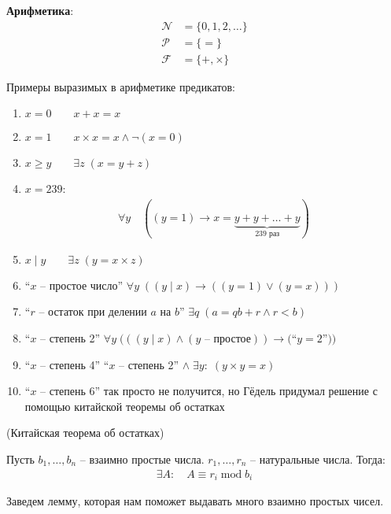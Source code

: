 \begin{conj}
    \textbf{Арифметика}:
    \begin{align*}
        \mathcal{N} &= \{0, 1, 2, \dots\} \\
        \mathcal{P} &= \{=\} \\
        \mathcal{F} &= \{+, \times \}
    \end{align*}
\end{conj}
Примеры выразимых в арифметике предикатов:
\begin{enumerate}
    \item $x = 0 \qquad x+x=x$
    \item $x=1 \qquad x \times x = x \land \lnot (x=0)$
    \item $x \geqslant y \qquad \exists z \; (x = y + z)$
    \item $x = 239$:
    \begin{gather*}
        \forall y \quad ((y=1) \longrightarrow x = \underbrace{y + y + \dots + y}_{239 \text{ раз}})
    \end{gather*}
    \item $x \mid y \qquad \exists z \; (y = x \times z)$
    \item ``$x$ -- простое число'' \qquad $\forall y \; ((y \mid x) \longrightarrow ((y=1) \lor (y=x)))$
    \item ``$r$ -- остаток при делении $a$ на $b$'' \qquad $\exists q \; (a = qb + r \land r < b)$
    \item ``$x$ -- степень 2'' \qquad $\forall y \; (((y \mid x) \land (y \text{ -- простое})) \longrightarrow ($``$y=2$''$))$
    \item ``$x$ -- степень 4'' \qquad ``$x$ -- степень 2'' $\land \; \exists y : \;(y \times y = x)$
    \item ``$x$ -- степень 6'' \qquad так просто не получится, но Гёдель придумал решение с помощью китайской теоремы об остатках 
\end{enumerate}
\begin{theorem}(Китайская теорема об остатках)

    Пусть $b_1, \dots, b_n$ -- взаимно простые числа. $r_1, \dots, r_n$ -- натуральные числа. Тогда:
        \begin{gather*}
            \exists A : \quad A \equiv r_i \operatorname{mod} b_i
        \end{gather*}
\end{theorem}

Заведем лемму, которая нам поможет выдавать много взаимно простых чисел.

